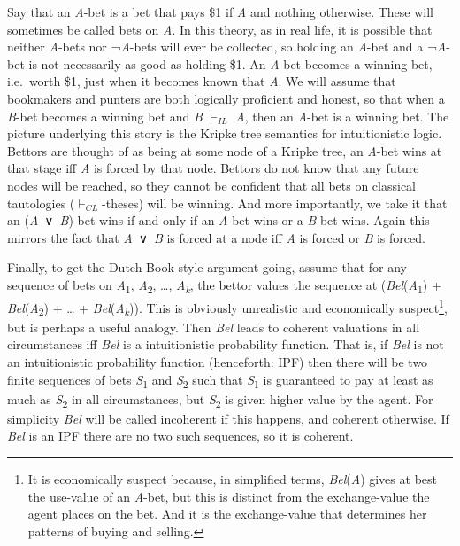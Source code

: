 \documentclass[
  11pt,
  letterpaper,
  DIV=11,
  numbers=noendperiod,
  twoside]{scrartcl}
\begin{document}
Say that an \emph{A}-bet is a bet that pays \$1 if \emph{A} and nothing
otherwise. These will sometimes be called bets on \emph{A}. In this
theory, as in real life, it is possible that neither \emph{A}-bets nor
¬\emph{A}-bets will ever be collected, so holding an \emph{A}-bet and a
¬\emph{A}-bet is not necessarily as good as holding \$1. An \emph{A}-bet
becomes a winning bet, i.e.~worth \$1, just when it becomes known that
\emph{A}. We will assume that bookmakers and punters are both logically
proficient and honest, so that when a \emph{B}-bet becomes a winning bet
and \emph{B} \(\vdash_{IL}\) \emph{A}, then an \emph{A}-bet is a winning
bet. The picture underlying this story is the Kripke tree semantics for
intuitionistic logic. Bettors are thought of as being at some node of a
Kripke tree, an \emph{A}-bet wins at that stage iff \emph{A} is forced
by that node. Bettors do not know that any future nodes will be reached,
so they cannot be confident that all bets on classical tautologies
(\(\vdash_{CL}\)-theses) will be winning. And more importantly, we take
it that an (\emph{A}~∨~\emph{B})-bet wins if and only if an \emph{A}-bet
wins or a \emph{B}-bet wins. Again this mirrors the fact that
\emph{A}~∨~\emph{B} is forced at a node iff \emph{A} is forced or
\emph{B} is forced.

Finally, to get the Dutch Book style argument going, assume that for any
sequence of bets on \emph{A}\textsubscript{1},
\emph{A}\textsubscript{2}, \ldots, \emph{A}\textsubscript{\emph{k}}, the
bettor values the sequence at (\emph{Bel}(\emph{A}\textsubscript{1}) +
\emph{Bel}(\emph{A}\textsubscript{2}) + \ldots{} +
\emph{Bel}(\emph{A}\textsubscript{\emph{k}})). This is obviously
unrealistic and economically suspect\footnote{It is economically suspect
  because, in simplified terms, \emph{Bel}(\emph{A}) gives at best the
  use-value of an \emph{A}-bet, but this is distinct from the
  exchange-value the agent places on the bet. And it is the
  exchange-value that determines her patterns of buying and selling.},
but is perhaps a useful analogy. Then \emph{Bel} leads to coherent
valuations in all circumstances iff \emph{Bel} is a intuitionistic
probability function. That is, if \emph{Bel} is not an intuitionistic
probability function (henceforth: IPF) then there will be two finite
sequences of bets \emph{S}\textsubscript{1} and
\emph{S}\textsubscript{2} such that \emph{S}\textsubscript{1} is
guaranteed to pay at least as much as \emph{S}\textsubscript{2} in all
circumstances, but \emph{S}\textsubscript{2} is given higher value by
the agent. For simplicity \emph{Bel} will be called incoherent if this
happens, and coherent otherwise. If \emph{Bel} is an IPF there are no
two such sequences, so it is coherent.
\end{document}
